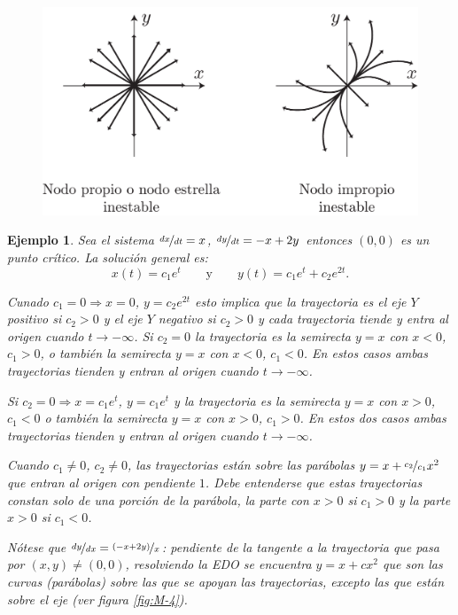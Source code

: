 \documentclass[a5paper,doc,10pt,noapacite]{apa6}
\newcommand{\yds}{\qquad\text{y}\qquad}
\newtheorem{ejem}{Ejemplo}
\begin{document}
{{\vspace{-1\baselineskip}
	\begin{figure}[H]
		\captionsetup{justification=centering, labelfont=footnotesize, font=footnotesize}
		\centering
		\includegraphics[scale=0.25]{Graficos/figura3}
		\caption{ }
		\label{fig:M-3}
	\end{figure}


\begin{ejem}
	Sea el sistema \(\nicefrac{dx}{dt}=x\), \(\nicefrac{dy}{dt}=-x+2y\) entonces \((0,0)\) es un punto crítico. La solución general es: 
	\[
		x(t)=c_1e^t	\yds	y(t)=c_1e^t+c_2e^{2t}.
	\]
	
	Cunado \(c_1=0 \Longrightarrow x=0\), \(y=c_2e^{2t}\) esto implica que la trayectoria es el eje \(Y\) positivo si \(c_2>0\) y el eje \(Y\) negativo si \(c_2>0\) y cada trayectoria tiende y  entra	 al origen cuando \(t\to-\infty\). Si \(c_2=0\) la trayectoria es la semirecta \(y=x\) con \(x<0\), \(c_1>0\), o también  la semirecta \(y=x\) con \(x<0\), \(c_1<0\). En estos casos ambas trayectorias tienden y entran al origen cuando \(t\to-\infty\).
	
	Si \(c_2=0\Longrightarrow x=c_1e^t\), \(y=c_1e^t\) y la trayectoria es la semirecta \(y=x\) con \(x>0\), \(c_1<0\) o también la
	semirecta \(y=x\) con \(x>0\), \(c_1>0\). En estos dos casos ambas trayectorias tienden y entran al origen cuando \(t\to-\infty\).
	
	Cuando \(c_1\neq0\), \(c_2\neq 0\), las trayectorias están sobre las parábolas \(y=x+\nicefrac{c_2}{c_1}x^2\) que entran al origen con	pendiente \(1\). Debe entenderse que estas trayectorias constan solo de una porción de la parábola, la parte con \(x>0\) si \(c_1>0\) y la parte \(x>0\) si \(c_1<0\).
	
	Nótese que \(\nicefrac{dy}{dx}=\nicefrac{(-x+2y)}{x}\): pendiente de la tangente a la trayectoria que pasa por \((x,y)\neq(0,0)\), resolviendo la EDO se encuentra \(y=x+cx^2\) que son las curvas (parábolas) sobre las que se apoyan las trayectorias, excepto las que están sobre el eje (ver figura \ref{fig:M-4}).
	

\end{ejem}}}
\end{document}

